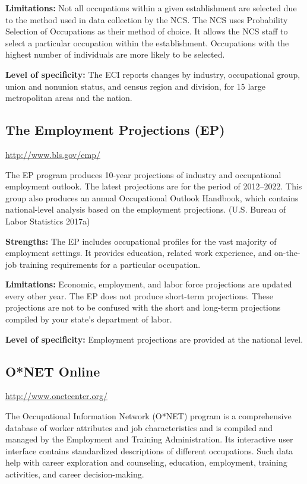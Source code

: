 \documentclass[]{book}
\theoremstyle{definition}
\theoremstyle{definition}
\theoremstyle{definition}
\theoremstyle{remark}
\begin{document}
\textbf{Limitations:} Not all occupations within a given establishment
are selected due to the method used in data collection by the NCS. The
NCS uses Probability Selection of Occupations as their method of choice.
It allows the NCS staff to select a particular occupation within the
establishment. Occupations with the highest number of individuals are
more likely to be selected.

\textbf{Level of specificity:} The ECI reports changes by industry,
occupational group, union and nonunion status, and census region and
division, for 15 large metropolitan areas and the nation.

\subsection{The Employment Projections
(EP)}\label{the-employment-projections-ep}

\url{http://www.bls.gov/emp/}

The EP program produces 10-year projections of industry and occupational
employment outlook. The latest projections are for the period of
2012--2022. This group also produces an annual Occupational Outlook
Handbook, which contains national-level analysis based on the employment
projections. (U.S. Bureau of Labor Statistics 2017a)

\textbf{Strengths:} The EP includes occupational profiles for the vast
majority of employment settings. It provides education, related work
experience, and on-the-job training requirements for a particular
occupation.

\textbf{Limitations:} Economic, employment, and labor force projections
are updated every other year. The EP does not produce short-term
projections. These projections are not to be confused with the short and
long-term projections compiled by your state's department of labor.

\textbf{Level of specificity:} Employment projections are provided at
the national level.

\subsection{O*NET Online}\label{onet-online}

\url{http://www.onetcenter.org/}

The Occupational Information Network (O*NET) program is a comprehensive
database of worker attributes and job characteristics and is compiled
and managed by the Employment and Training Administration. Its
interactive user interface contains standardized descriptions of
different occupations. Such data help with career exploration and
counseling, education, employment, training activities, and career
decision-making.
\end{document}
